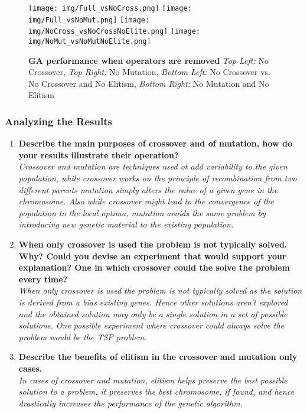 \documentclass{article}
\begin{document}
		\begin{figure}[h!]
		\texttt{[image: img/Full\_vsNoCross.png]}
		\texttt{[image: img/Full\_vsNoMut.png]}
		\texttt{[image: img/NoCross\_vsNoCrossNoElite.png]}
		\texttt{[image: img/NoMut\_vsNoMutNoElite.png]}
		\caption
		{
		\textbf{GA performance when operators are removed}\newline
		\textit{Top Left:} No Crossover,
		\textit{Top Right:} No Mutation, 
		\textit{Bottom Left:} No Crossover vs. No Crossover and No Elitism, 
		\textit{Bottom Right:} No Mutation and No Elitism
		}
		\end{figure}
\newpage
\subsubsection{Analyzing the Results}
\begin{enumerate}
	\item \textbf{Describe the main purposes of crossover and of mutation, how do your results illustrate their operation?} \\
\textit{
 \color{blue}Crossover and mutation are techniques used ot add variability to the given population, while crossover works on the principle of recombination from two different parents mutation simply alters the value of a given gene in the chromosome. Also while crossover might lead to the convergence of the population to the local optima, mutation avoids the same problem by introducing new genetic material to the existing population.
 }

	\item \textbf{When only crossover is used the problem is not typically solved. Why? Could you devise an experiment that would support your explanation? One in which crossover could the solve the problem every time?}\\
\textit{
\color{blue}When only crossover is used the problem is not typically solved as the solution is derived from a bias existing genes. Hence other solutions aren't explored and the obtained solution may only be a single solution in a set of possible solutions. One possible experiment where crossover could always solve the problem would be the TSP problem.
 }
	
	\item \textbf{Describe the benefits of elitism in the crossover and mutation only cases.}\\
\textit{
\color{blue}In cases of crossover and mutation, elitism helps preserve the best possible solution to a problem. it preserves the best chromosome, if found, and hence drastically increases the performance of the  genetic algorithm.
}

\end{enumerate}
\end{document}
